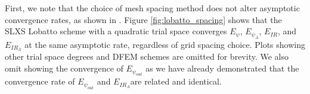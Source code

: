 First, we note that the choice of mesh spacing method does not alter asymptotic convergence rates, as shown in .  Figure \ref{fig:lobatto_spacing} shows that the SLXS Lobatto scheme with a quadratic trial space converges $E_{\psi}$, $E_{\psi_A}$, $E_{IR}$, and $E_{IR_A}$ at the same asymptotic rate, regardless of grid spacing choice.  Plots showing other trial space degrees and DFEM schemes are omitted for brevity.  We also omit showing the convergence of $E_{\psi_{out}}$ as we have already demonstrated that the convergence rate of $E_{\psi_{out}}$ and $E_{IR_A}$are related and identical.
\begin{figure}[!htp]
\begin{center}
\subfigure[$E_{IR}$]{
}
\end{center}
\end{figure}
